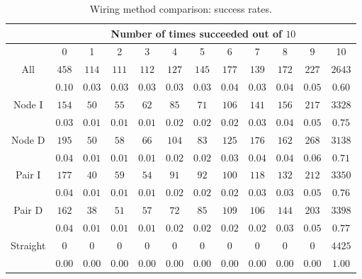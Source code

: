 \begin{table}[H]
\begin{center}
\begin{singlespace}
\begin{tabular}{|c||c|c|c|c|c|c|c|c|c|c|c|}
\hline
 & \multicolumn{11}{|c|}{Number of times succeeded out of $10$} \\
\hline
 & 0 & 1 & 2 & 3 & 4 & 5 & 6 & 7 & 8 & 9 & 10 \\
\hline\hline
All & $458$ & $114$ & $111$ & $112$ & $127$ & $145$ & $177$ & $139$ & $172$ & $227$ & $2643$ \\
 & $0.10$ & $0.03$ & $0.03$ & $0.03$ & $0.03$ & $0.03$ & $0.04$ & $0.03$ & $0.04$ & $0.05$ & $0.60$ \\
\hline
 Node I & $154$ & $50$ & $55$ & $62$ & $85$ & $71$ & $106$ & $141$ & $156$ & $217$ & $3328$ \\
  & $0.03$ & $0.01$ & $0.01$ & $0.01$ & $0.02$ & $0.02$ & $0.02$ & $0.03$ & $0.04$ & $0.05$ & $0.75$ \\
\hline
  Node D & $195$ & $50$ & $58$ & $66$ & $104$ & $83$ & $125$ & $176$ & $162$ & $268$ & $3138$ \\
   & $0.04$ & $0.01$ & $0.01$ & $0.01$ & $0.02$ & $0.02$ & $0.03$ & $0.04$ & $0.04$ & $0.06$ & $0.71$ \\
\hline
   Pair I & $177$ & $40$ & $59$ & $54$ & $91$ & $92$ & $100$ & $118$ & $132$ & $212$ & $3350$ \\
    & $0.04$ & $0.01$ & $0.01$ & $0.01$ & $0.02$ & $0.02$ & $0.02$ & $0.03$ & $0.03$ & $0.05$ & $0.76$ \\
\hline
    Pair D & $162$ & $38$ & $51$ & $57$ & $72$ & $85$ & $109$ & $106$ & $144$ & $203$ & $3398$ \\
     & $0.04$ & $0.01$ & $0.01$ & $0.01$ & $0.02$ & $0.02$ & $0.02$ & $0.02$ & $0.03$ & $0.05$ & $0.77$ \\
\hline
     Straight & $0$ & $0$ & $0$ & $0$ & $0$ & $0$ & $0$ & $0$ & $0$ & $0$ & $4425$ \\
      & $0.00$ & $0.00$ & $0.00$ & $0.00$ & $0.00$ & $0.00$ & $0.00$ & $0.00$ & $0.00$ & $0.00$ & $1.00$ \\
\hline
\end{tabular}
\end{singlespace}
\end{center}
\label{tb:wiring_success}
\caption{Wiring method comparison: success rates.}
\end{table}

